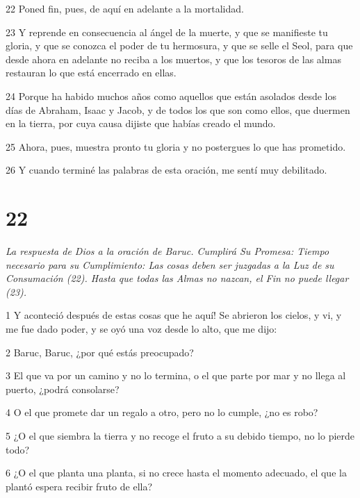 \par 22 Poned fin, pues, de aquí en adelante a la mortalidad.

\par 23 Y reprende en consecuencia al ángel de la muerte, y que se manifieste tu gloria, y que se conozca el poder de tu hermosura, y que se selle el Seol, para que desde ahora en adelante no reciba a los muertos, y que los tesoros de las almas restauran lo que está encerrado en ellas.

\par 24 Porque ha habido muchos años como aquellos que están asolados desde los días de Abraham, Isaac y Jacob, y de todos los que son como ellos, que duermen en la tierra, por cuya causa dijiste que habías creado el mundo.

\par 25 Ahora, pues, muestra pronto tu gloria y no postergues lo que has prometido.

\par 26 Y cuando terminé las palabras de esta oración, me sentí muy debilitado.

\chapter{22}

\par \textit{La respuesta de Dios a la oración de Baruc. Cumplirá Su Promesa: Tiempo necesario para su Cumplimiento: Las cosas deben ser juzgadas a la Luz de su Consumación (22). Hasta que todas las Almas no nazcan, el Fin no puede llegar (23).}

\par 1 Y aconteció después de estas cosas que he aquí! Se abrieron los cielos, y vi, y me fue dado poder, y se oyó una voz desde lo alto, que me dijo:

\par 2 Baruc, Baruc, ¿por qué estás preocupado?

\par 3 El que va por un camino y no lo termina, o el que parte por mar y no llega al puerto, ¿podrá consolarse?

\par 4 O el que promete dar un regalo a otro, pero no lo cumple, ¿no es robo?

\par 5 ¿O el que siembra la tierra y no recoge el fruto a su debido tiempo, no lo pierde todo?

\par 6 ¿O el que planta una planta, si no crece hasta el momento adecuado, el que la plantó espera recibir fruto de ella?

